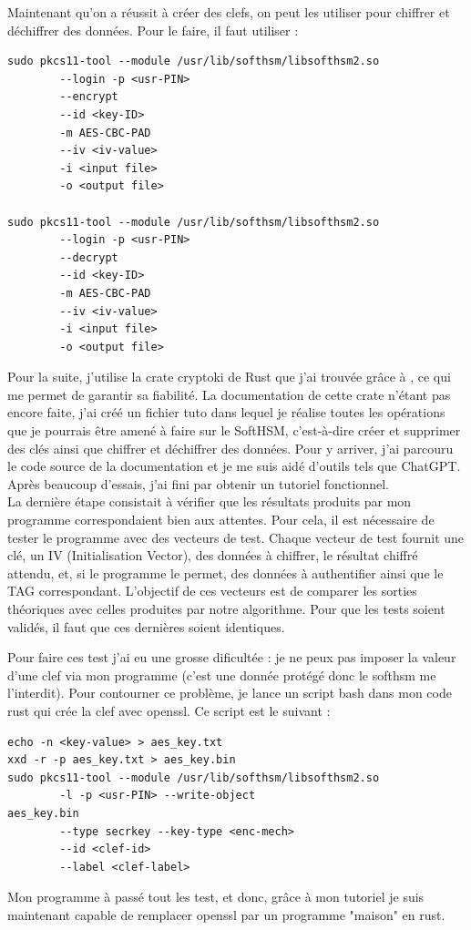 \documentclass[a4paper, 12pt]{article}
\begin{document}
Maintenant qu'on a réussit à créer des clefs, on peut les utiliser pour chiffrer et déchiffrer des données. Pour le faire, il faut utiliser :
\begin{verbatim}
sudo pkcs11-tool --module /usr/lib/softhsm/libsofthsm2.so 
		--login -p <usr-PIN> 
		--encrypt 
		--id <key-ID> 
		-m AES-CBC-PAD 
		--iv <iv-value> 
		-i <input file> 
		-o <output file>

sudo pkcs11-tool --module /usr/lib/softhsm/libsofthsm2.so 
		--login -p <usr-PIN> 
		--decrypt 
		--id <key-ID> 
		-m AES-CBC-PAD 
		--iv <iv-value> 
		-i <input file> 
		-o <output file>
\end{verbatim}

Pour la suite, j'utilise la crate cryptoki de Rust que j'ai trouvée grâce à \cite{bddrustcrypto}, ce qui me permet de garantir sa fiabilité.
La documentation de cette crate n'étant pas encore faite, j'ai créé un fichier tuto dans lequel je réalise toutes les opérations que je pourrais être amené à faire sur le SoftHSM, c'est-à-dire créer et supprimer des clés ainsi que chiffrer et déchiffrer des données. Pour y arriver, j'ai parcouru le code source de la documentation et je me suis aidé d'outils tels que ChatGPT. Après beaucoup d'essais, j'ai fini par obtenir un tutoriel fonctionnel.\\

La dernière étape consistait à vérifier que les résultats produits par mon programme correspondaient bien aux attentes. Pour cela, il est nécessaire de tester le programme avec des vecteurs de test. Chaque vecteur de test fournit une clé, un IV (Initialisation Vector), des données à chiffrer, le résultat chiffré attendu, et, si le programme le permet, des données à authentifier ainsi que le TAG correspondant. L'objectif de ces vecteurs est de comparer les sorties théoriques avec celles produites par notre algorithme. Pour que les tests soient validés, il faut que ces dernières soient identiques.

Pour faire ces test j'ai eu une grosse dificultée : je ne peux pas imposer la valeur d'une clef via mon programme (c'est une donnée protégé donc le softhsm me l'interdit). Pour contourner ce problème, je lance un script bash dans mon code rust qui crée la clef avec openssl. Ce script est le suivant : 
\begin{verbatim}
echo -n <key-value> > aes_key.txt
xxd -r -p aes_key.txt > aes_key.bin
sudo pkcs11-tool --module /usr/lib/softhsm/libsofthsm2.so 
		-l -p <usr-PIN> --write-object
aes_key.bin 
		--type secrkey --key-type <enc-mech> 
		--id <clef-id> 
		--label <clef-label>
\end{verbatim}
Mon programme à passé tout les test, et donc, grâce à mon tutoriel je suis maintenant capable de remplacer openssl par un programme "maison" en rust.
\end{document}
